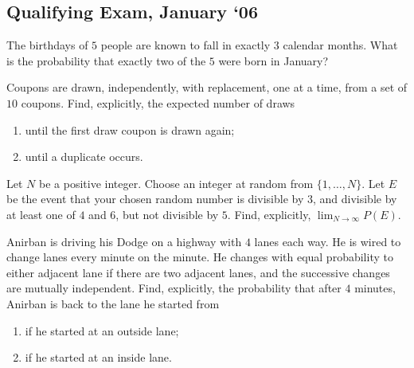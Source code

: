 \subsection{Qualifying Exam, January `06}
\begin{problem}
  The birthdays of \(5\) people are known to fall in exactly \(3\) calendar
  months. What is the probability that exactly two of the \(5\) were born
  in January?
\end{problem}
\begin{solution*}
\end{solution*}

\begin{problem}
  Coupons are drawn, independently, with replacement, one at a time, from a
  set of \(10\) coupons. Find, explicitly, the expected number of draws
  \begin{enumerate}[label=(\alph*),noitemsep]
  \item until the first draw coupon is drawn again;
  \item until a duplicate occurs.
  \end{enumerate}
\end{problem}
\begin{solution*}
\end{solution*}

\begin{problem}
  Let \(N\) be a positive integer. Choose an integer at random from
  \(\{1,\dotsc,N\}\). Let \(E\) be the event that your chosen random number
  is divisible by \(3\), and divisible by at least one of \(4\) and \(6\),
  but not divisible by \(5\). Find, explicitly, \(\lim_{N\to\infty}P(E)\).
\end{problem}
\begin{solution*}
\end{solution*}

\begin{problem}
  Anirban is driving his Dodge on a highway with \(4\) lanes each way. He
  is wired to change lanes every minute on the minute. He changes with
  equal probability to either adjacent lane if there are two adjacent
  lanes, and the successive changes are mutually independent. Find,
  explicitly, the probability that after \(4\) minutes, Anirban is back to
  the lane he started from
  \begin{enumerate}[label=(\alph*),noitemsep]
  \item if he started at an outside lane;
  \item if he started at an inside lane.
  \end{enumerate}
\end{problem}
\begin{solution*}
\end{solution*}

